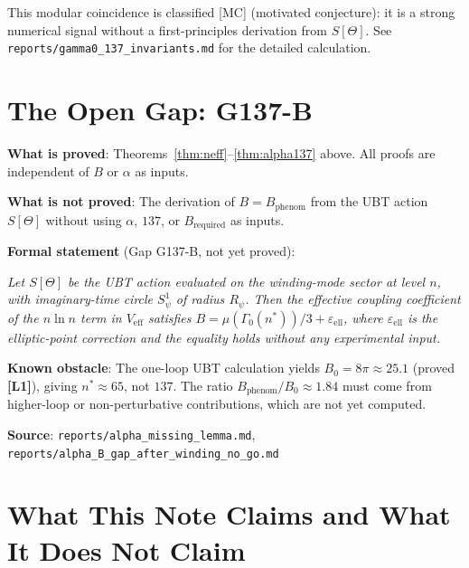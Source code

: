 \documentclass[12pt,a4paper]{article}
\theoremstyle{definition}
\theoremstyle{remark}
\newcommand{\Lone}{\textbf{[L1]}}
\begin{document}
This modular coincidence is classified [MC] (motivated conjecture): it is a
strong numerical signal without a first-principles derivation from $S[\Theta]$.
See \texttt{reports/gamma0\_137\_invariants.md} for the detailed calculation.

\section{The Open Gap: G137-B}
\label{sec:gap}

\begin{tcolorbox}[enhanced,colback=red!4!white,colframe=red!55!black,
  arc=3pt,boxrule=1.2pt,title={\textbf{Gap G137-B — The Single Missing Derivation}}]

\textbf{What is proved}: Theorems~\ref{thm:neff}–\ref{thm:alpha137} above.
All proofs are independent of $B$ or $\alpha$ as inputs.

\smallskip
\textbf{What is not proved}: The derivation of $B = B_{\mathrm{phenom}}$ from
the UBT action $S[\Theta]$ without using $\alpha$, $137$, or
$B_{\mathrm{required}}$ as inputs.

\smallskip
\textbf{Formal statement} (Gap G137-B, not yet proved):

\emph{Let $S[\Theta]$ be the UBT action evaluated on the winding-mode sector
at level $n$, with imaginary-time circle $S^1_\psi$ of radius $R_\psi$.
Then the effective coupling coefficient of the $n\ln n$ term in $V_{\mathrm{eff}}$
satisfies
$B = \mu(\Gamma_0(n^*))/3 + \varepsilon_{\mathrm{ell}}$,
where $\varepsilon_{\mathrm{ell}}$ is the elliptic-point correction and the
equality holds without any experimental input.}

\smallskip
\textbf{Known obstacle}: The one-loop UBT calculation yields $B_0 = 8\pi \approx 25.1$
(proved \Lone), giving $n^* \approx 65$, not $137$.  The ratio
$B_{\mathrm{phenom}}/B_0 \approx 1.84$ must come from higher-loop or
non-perturbative contributions, which are not yet computed.

\smallskip
\textbf{Source}: \texttt{reports/alpha\_missing\_lemma.md},
\texttt{reports/alpha\_B\_gap\_after\_winding\_no\_go.md}
\end{tcolorbox}

\section{What This Note Claims and What It Does Not Claim}
\label{sec:claims}
\end{document}
